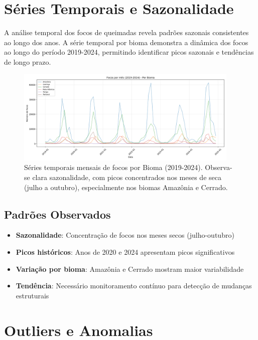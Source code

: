 \documentclass[12pt,a4paper]{report}
\begin{document}
\section{Séries Temporais e Sazonalidade}

A análise temporal dos focos de queimadas revela padrões sazonais consistentes ao longo dos anos. A série temporal por bioma demonstra a dinâmica dos focos ao longo do período 2019-2024, permitindo identificar picos sazonais e tendências de longo prazo.

\begin{figure}[h]
\centering
\includegraphics[width=0.95\textwidth]{figs/eda/series_bioma.png}
\caption{Séries temporais mensais de focos por Bioma (2019-2024). Observa-se clara sazonalidade, com picos concentrados nos meses de seca (julho a outubro), especialmente nos biomas Amazônia e Cerrado.}
\label{fig:series_bioma}
\end{figure}

\subsection{Padrões Observados}

\begin{itemize}
  \item \textbf{Sazonalidade}: Concentração de focos nos meses secos (julho-outubro)
  \item \textbf{Picos históricos}: Anos de 2020 e 2024 apresentam picos significativos
  \item \textbf{Variação por bioma}: Amazônia e Cerrado mostram maior variabilidade
  \item \textbf{Tendência}: Necessário monitoramento contínuo para detecção de mudanças estruturais
\end{itemize}

\section{Outliers e Anomalias}
\end{document}
